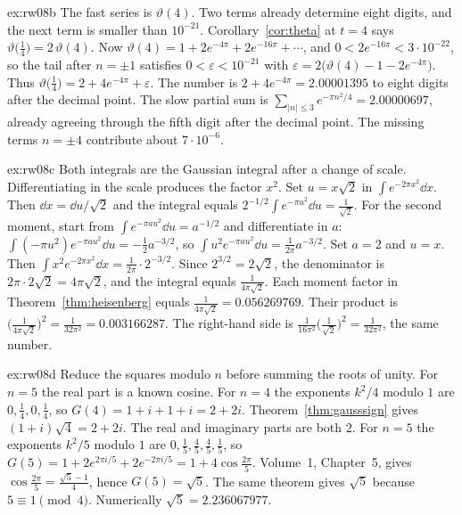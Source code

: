 \begin{solution}{ex:rw08b}
\idea The fast series is $\vartheta(4)$. Two terms already determine eight digits, and the next term is smaller than $10^{-21}$.
\writeup Corollary~\ref{cor:theta} at $t=4$ says $\vartheta\bigl(\frac14\bigr)=2\,\vartheta(4)$. Now $\vartheta(4)=1+2e^{-4\pi}+2e^{-16\pi}+\cdots$, and $0<2e^{-16\pi}<3\cdot10^{-22}$, so the tail after $n=\pm1$ satisfies $0<\varepsilon<10^{-21}$ with $\varepsilon=2\bigl(\vartheta(4)-1-2e^{-4\pi}\bigr)$. Thus $\vartheta\bigl(\frac14\bigr)=2+4e^{-4\pi}+\varepsilon$. The number is $2+4e^{-4\pi}=2.00001395$ to eight digits after the decimal point. The slow partial sum is $\sum_{|n|\le3}e^{-\pi n^2/4}=2.00000697$, already agreeing through the fifth digit after the decimal point. The missing terms $n=\pm4$ contribute about $7\cdot10^{-6}$.
\end{solution}

\begin{solution}{ex:rw08c}
\idea Both integrals are the Gaussian integral after a change of scale. Differentiating in the scale produces the factor $x^2$.
\writeup Set $u=x\sqrt2$ in $\int e^{-2\pi x^2}\dd x$. Then $\dd x=\dd u/\sqrt2$ and the integral equals $2^{-1/2}\int e^{-\pi u^2}\dd u=\frac1{\sqrt2}$. For the second moment, start from $\int e^{-\pi a u^2}\dd u=a^{-1/2}$ and differentiate in $a$: $\int(-\pi u^2)e^{-\pi a u^2}\dd u=-\frac12 a^{-3/2}$, so $\int u^2e^{-\pi a u^2}\dd u=\frac1{2\pi}a^{-3/2}$. Set $a=2$ and $u=x$. Then $\int x^2e^{-2\pi x^2}\dd x=\frac1{2\pi}\cdot 2^{-3/2}$. Since $2^{3/2}=2\sqrt2$, the denominator is $2\pi\cdot 2\sqrt2=4\pi\sqrt2$, and the integral equals $\frac1{4\pi\sqrt2}$. Each moment factor in Theorem~\ref{thm:heisenberg} equals $\frac1{4\pi\sqrt2}=0.056269769$. Their product is $\bigl(\frac1{4\pi\sqrt2}\bigr)^2=\frac1{32\pi^2}=0.003166287$. The right-hand side is $\frac1{16\pi^2}\bigl(\frac1{\sqrt2}\bigr)^2=\frac1{32\pi^2}$, the same number.
\end{solution}

\begin{solution}{ex:rw08d}
\idea Reduce the squares modulo $n$ before summing the roots of unity. For $n=5$ the real part is a known cosine.
\writeup For $n=4$ the exponents $k^2/4$ modulo $1$ are $0,\frac14,0,\frac14$, so $G(4)=1+i+1+i=2+2i$. Theorem~\ref{thm:gausssign} gives $(1+i)\sqrt4=2+2i$. The real and imaginary parts are both $2$. For $n=5$ the exponents $k^2/5$ modulo $1$ are $0,\frac15,\frac45,\frac45,\frac15$, so $G(5)=1+2e^{2\pi i/5}+2e^{-2\pi i/5}=1+4\cos\frac{2\pi}5$. Volume~1, Chapter~5, gives $\cos\frac{2\pi}5=\frac{\sqrt5-1}4$, hence $G(5)=\sqrt5$. The same theorem gives $\sqrt5$ because $5\equiv1\pmod4$. Numerically $\sqrt5=2.236067977$.
\end{solution}

